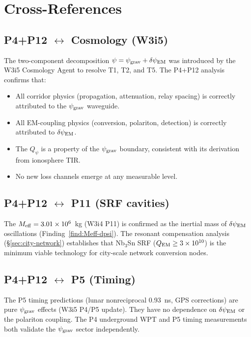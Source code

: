 \documentclass[11pt]{article}
\newcommand{\ee}[1]{\times 10^{#1}}
\newcommand{\psigrav}{\psi_{\rm grav}}
\newcommand{\dpsiEM}{\delta\psi_{\rm EM}}
\newcommand{\Meff}{M_{\rm eff}}
\newcommand{\Qpsi}{Q_\psi}
\begin{document}
\section{Cross-References}
\label{sec:crossrefs}

\subsection{P4+P12 $\leftrightarrow$ Cosmology (W3i5)}

The two-component decomposition $\psi = \psigrav + \dpsiEM$ was introduced
by the W3i5 Cosmology Agent to resolve T1, T2, and T5. The P4+P12
analysis confirms that:
\begin{itemize}[nosep]
  \item All corridor physics (propagation, attenuation, relay spacing)
    is correctly attributed to the $\psigrav$ waveguide.
  \item All EM-coupling physics (conversion, polariton, detection)
    is correctly attributed to $\dpsiEM$.
  \item The $\Qpsi$ is a property of the $\psigrav$ boundary, consistent
    with its derivation from ionosphere TIR.
  \item No new loss channels emerge at any measurable level.
\end{itemize}

\subsection{P4+P12 $\leftrightarrow$ P11 (SRF cavities)}

The $\Meff = 3.01\ee{6}$~kg (W3i4 P11) is confirmed as the inertial
mass of $\dpsiEM$ oscillations (Finding~\ref{find:Meff-dpsi}).
The resonant compensation analysis (\S\ref{sec:city-network}) establishes
that Nb$_3$Sn SRF ($Q_{\rm EM} \geq 3\ee{10}$) is the minimum viable
technology for city-scale network conversion nodes.

\subsection{P4+P12 $\leftrightarrow$ P5 (Timing)}

The P5 timing predictions (lunar nonreciprocal 0.93~ns, GPS corrections)
are pure $\psigrav$ effects (W3i5 P4/P5 update). They have no dependence
on $\dpsiEM$ or the polariton coupling. The P4 underground WPT and P5
timing measurements both validate the $\psigrav$ sector independently.
\end{document}
